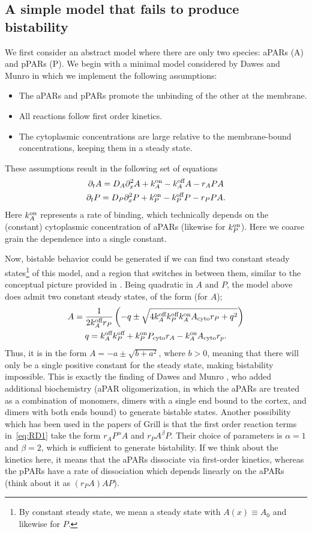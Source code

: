 \documentclass[11pt]{article}
\newcommand{\6}[1]{#1_{\text{6}}}
\newcommand{\3}[1]{#1_{\text{3}}}
\begin{document}
\subsection{A simple model that fails to produce bistability}
We first consider an abstract model where there are only two species: aPARs (A) and pPARs (P). We begin with a minimal model considered by Dawes and Munro \cite{dawes20113} in which we implement the following assumptions:
\begin{itemize}
\item The aPARs and pPARs promote the unbinding of the other at the membrane.
\item All reactions follow first order kinetics.
\item The cytoplasmic concentrations are large relative to the membrane-bound concentrations, keeping them in a steady state.
\end{itemize}
These assumptions result in the following set of equations \cite[Eq.~(3)]{dawes20113}
\begin{gather}
\label{eq:RD1}
\partial_t A =D_A \partial_x^2 A + k^\text{on}_A -k^\text{off}_A A - r_A P A  \\ \nonumber
\partial_t P = D_P \partial_x^2 P + k^\text{on}_P -k^\text{off}_P P - r_P P A.
\end{gather}
Here $k^\text{on}_A$ represents a rate of binding, which technically depends on the (constant) cytoplasmic concentration of aPARs (likewise for $k^\text{on}_P$). Here we coarse grain the dependence into a single constant. 

Now, bistable behavior could be generated if we can find two constant steady states\footnote{By constant steady state, we mean a steady state with $A(x)\equiv A_0$ and likewise for $P$.} of this model, and a region that switches in between them, similar to the conceptual picture provided in \cite[Fig.~2(c)]{halatek2018self}. Being quadratic in $A$ and $P$, the model above does admit two constant steady states, of the form (for $A$);
\begin{gather}
A = \frac{1}{2k^\text{off}_A r_P }\left(-q \pm \sqrt{4 k^\text{off}_A k^\text{off}_P k^\text{on}_A A_\text{cyto} r_P + q^2}\right) \\ \nonumber
q = k^\text{off}_A k^\text{off}_P + k^\text{on}_P P_\text{cyto} r_A -k^\text{on}_A A_\text{cyto} r_p .
\end{gather}
Thus, it is in the form $A=-a \pm \sqrt{b+a^2}$, where $b > 0$, meaning that there will only be a single positive constant for the steady state, making bistability impossible. This is exactly the finding of Dawes and Munro \cite{dawes20113}, who added additional biochemistry (aPAR oligomerization, in which the aPARs are treated as a combination of monomers, dimers with a single end bound to the cortex, and dimers with both ends bound) to generate bistable states. Another possibility which has been used in the papers of Grill \cite{goehring2011polarization, gross2019guiding} is that the first order reaction terms in\ \eqref{eq:RD1} take the form $r_A P^\alpha A$ and $r_P  A^\beta P$. Their choice of parameters is $\alpha=1$ and $\beta=2$, which is sufficient to generate bistability. If we think about the kinetics here, it means that the aPARs dissociate via first-order kinetics, whereas the pPARs have a rate of dissociation which depends linearly on the aPARs (think about it as $\left(r_P A\right)AP$).
\end{document}

